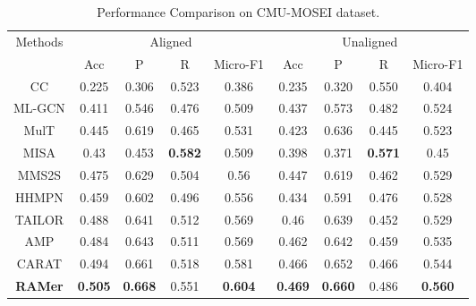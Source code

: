 \begin{table}[t]
\begin{center}
\caption{Performance Comparison on CMU-MOSEI dataset.} \label{tab:cmu-mosei} 
\vspace{-1em}
\resizebox{\columnwidth}{!}
{ 
\begin{tabular}{c|cccc|cccc}
    \hline
    \hline

    \multirow{2}{*}{Methods} & \multicolumn{4}{c|}{Aligned}      & \multicolumn{4}{c}{Unaligned}    \\ 
    \cline{2-9} 
                                  
                             
    & Acc   & P     & R     & Micro-F1 
    & Acc   & P     & R     & Micro-F1 \\ 
    \hline

    CC                    
    & 0.225 & 0.306 & 0.523 & 0.386    
    & 0.235 & 0.320 & 0.550 & 0.404    
    \\

    ML-GCN                   
    & 0.411 & 0.546 & 0.476 & 0.509    
    & 0.437 & 0.573 & 0.482 & 0.524    
    \\
    
    MulT                    
    & 0.445 & 0.619 & 0.465 & 0.531    
    & 0.423 & 0.636 & 0.445 & 0.523    
    \\
    
                                    
    MISA                    
    & 0.43  & 0.453 & \textbf{0.582} & 0.509    
    & 0.398 & 0.371 & \textbf{0.571} & 0.45     
    \\ 
    
    
    MMS2S                    
    & 0.475 & 0.629 & 0.504 & 0.56     
    & 0.447 & 0.619 & 0.462 & 0.529    
    \\  
    
    HHMPN                  
    & 0.459 & 0.602 & 0.496 & 0.556    
    & 0.434 & 0.591 & 0.476 & 0.528    
    \\ 
    
    TAILOR                  
    & 0.488 & 0.641 & 0.512 & 0.569    
    & 0.46  & 0.639 & 0.452 & 0.529    
    \\ 
    
    AMP                      
    & 0.484 & 0.643 & 0.511 & 0.569    
    & 0.462 & 0.642 & 0.459 & 0.535    
    \\  
    
    CARAT                   
    & 0.494 & 0.661 & 0.518 & 0.581    
    & 0.466 & 0.652 & 0.466 & 0.544    
    \\ 
    \hline 
    
    \textbf{RAMer}                   
    & \textbf{0.505} & \textbf{0.668} & 0.551 & \textbf{0.604}    
    & \textbf{0.469} & \textbf{0.660} & 0.486 & \textbf{0.560}    
    \\ 
    \hline
    \hline
\end{tabular}
}
\vspace{-1em}
\end{center}
\end{table}

